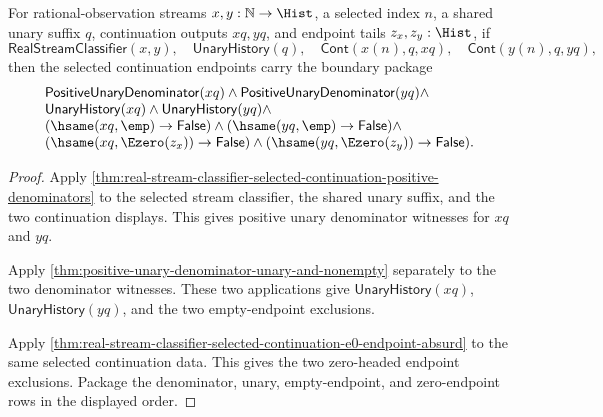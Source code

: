 \begin{theorem}
\label{thm:real-stream-classifier-selected-continuation-endpoint-boundary-package}
For rational-observation streams $x,y:\mathbb{N}\to\Hist$, a selected index
$n$, a shared unary suffix $q$, continuation outputs $xq,yq$, and endpoint
tails $z_x,z_y:\Hist$, if
$$
\mathsf{RealStreamClassifier}(x,y),\quad
\mathsf{UnaryHistory}(q),\quad
\mathsf{Cont}(x(n),q,xq),\quad
\mathsf{Cont}(y(n),q,yq),
$$
then the selected continuation endpoints carry the boundary package
$$
\begin{array}{l}
\mathsf{PositiveUnaryDenominator}(xq)\land
\mathsf{PositiveUnaryDenominator}(yq)\land\\
\mathsf{UnaryHistory}(xq)\land
\mathsf{UnaryHistory}(yq)\land\\
(\hsame(xq,\emp)\to\mathsf{False})\land
(\hsame(yq,\emp)\to\mathsf{False})\land\\
(\hsame(xq,\Ezero(z_x))\to\mathsf{False})\land
(\hsame(yq,\Ezero(z_y))\to\mathsf{False}).
\end{array}
$$
\end{theorem}
\begin{proof}
Apply
\autoref{thm:real-stream-classifier-selected-continuation-positive-denominators}
to the selected stream classifier, the shared unary suffix, and the two
continuation displays. This gives positive unary denominator witnesses for
$xq$ and $yq$.

Apply \autoref{thm:positive-unary-denominator-unary-and-nonempty} separately to
the two denominator witnesses. These two applications give
$\mathsf{UnaryHistory}(xq)$, $\mathsf{UnaryHistory}(yq)$, and the two
empty-endpoint exclusions.

Apply
\autoref{thm:real-stream-classifier-selected-continuation-e0-endpoint-absurd}
to the same selected continuation data. This gives the two zero-headed endpoint
exclusions. Package the denominator, unary, empty-endpoint, and zero-endpoint
rows in the displayed order.
\end{proof}


